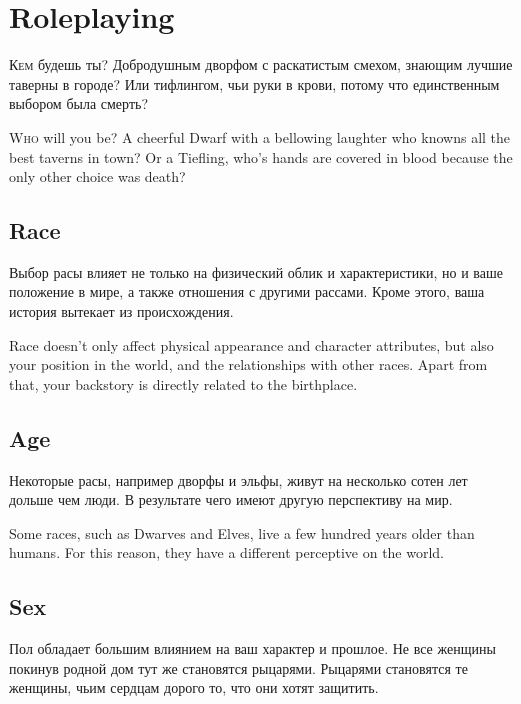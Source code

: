 \documentclass[a5paper,11pt]{book}
\begin{document}
\chapter{Roleplaying}
\begin{multicols}{2}
\begin{ru}
\lettrine{К}{ем} будешь ты? Добродушным дворфом с раскатистым смехом, знающим лучшие таверны в городе? Или тифлингом, чьи руки в крови, потому что единственным выбором была смерть?
\end{ru}

\begin{en}
\lettrine{W}{ho} will you be? A cheerful Dwarf with a bellowing laughter who knowns all the best taverns in town? Or a Tiefling, who's hands are covered in blood because the only other choice was death?
\end{en}

\section{Race}
\begin{ru}
Выбор расы влияет не только на физический облик и характеристики, но и ваше положение в мире, а также отношения с другими рассами. Кроме этого, ваша история вытекает из происхождения.
\end{ru}

\begin{en}
Race doesn't only affect physical appearance and character attributes, but also your position in the world, and the relationships with other races. Apart from that, your backstory is directly related to the birthplace.
\end{en}

\section{Age}
\begin{ru}
Некоторые расы, например дворфы и эльфы, живут на несколько сотен лет дольше чем люди. В результате чего имеют другую перспективу на мир.
\end{ru}

\begin{en}
Some races, such as Dwarves and Elves, live a few hundred years older than humans. For this reason, they have a different perceptive on the world.
\end{en}

\section{Sex}
\begin{ru}
Пол обладает большим влиянием на ваш характер и прошлое. Не все женщины покинув родной дом тут же становятся рыцарями. Рыцарями становятся те женщины, чьим сердцам дорого то, что они хотят защитить.
\end{ru}


\end{multicols}
\end{document}
